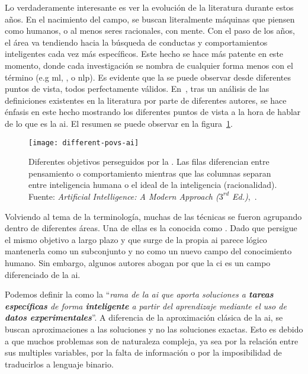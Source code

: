 Lo verdaderamente interesante es ver la evolución de la literatura durante estos años. En el nacimiento del campo, se buscan literalmente máquinas que piensen como humanos, o al menos seres racionales, con mente. Con el paso de los años, el área va tendiendo hacia la búsqueda de conductas y comportamientos inteligentes cada vez más específicos. Este hecho se hace más patente en este momento, donde cada investigación se nombra de cualquier forma menos con el término  (e.g \Acrfull{ml}, , o \Acrfull{nlp}). Es evidente que la  se puede observar desde diferentes puntos de vista, todos perfectamente válidos. En~\cite{russell2003artificial}, tras un análisis de las definiciones existentes en la literatura por parte de diferentes autores, se hace énfasis en este hecho mostrando los diferentes puntos de vista a la hora de hablar de lo que es la \gls{ai}. El resumen se puede observar en la figura~\ref{fig:different-povs-ai}.

\begin{figure}[t]
	\texttt{[image: different-povs-ai]}
	\caption[Diferentes objetivos perseguidos por la ]{Diferentes objetivos perseguidos por la . Las filas diferencian entre pensamiento o comportamiento mientras que las columnas separan entre inteligencia humana o el ideal de la inteligencia (racionalidad). Fuente: \textit{Artificial Intelligence: A Modern Approach ($3^{rd}$ Ed.)},~\cite{russell2003artificial}.}
	\label{fig:different-povs-ai}
\end{figure}

Volviendo al tema de la terminología, muchas de las técnicas se fueron agrupando dentro de diferentes áreas. Una de ellas es la conocida como . Dado que persigue el mismo objetivo a largo plazo y que surge de la propia \gls{ai} parece lógico mantenerla como un subconjunto y no como un nuevo campo del conocimiento humano. Sin embargo, algunos autores abogan por que la \gls{ci} es un campo diferenciado de la \gls{ai}.

Podemos definir la  como la \enquote{\textit{rama de la \gls{ai} que aporta soluciones a \textbf{tareas específicas} de forma \textbf{inteligente} a partir del aprendizaje mediante el uso de \textbf{datos experimentales}}}. A diferencia de la aproximación clásica de la \gls{ai}, se buscan aproximaciones a las soluciones y no las soluciones exactas. Esto es debido a que muchos problemas son de naturaleza compleja, ya sea por la relación entre sus multiples variables, por la falta de información o por la imposibilidad de traducirlos a lenguaje binario.

